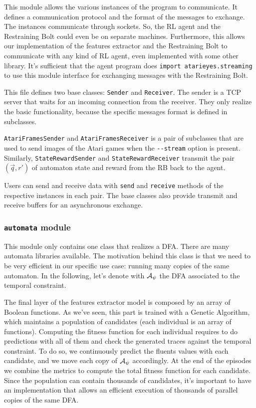 This module allows the various instances of the program to communicate. It
defines a communication protocol and the format of the messages to exchange.
The instances communicate through sockets. So, the RL agent and the
Restraining Bolt could even be on separate machines. Furthermore, this allows
our implementation of the features extractor and the Restraining Bolt to
communicate with any kind of RL agent, even implemented with some other
library. It's sufficient that the agent program does
\lstinline[style=inlinepy]|import atarieyes.streaming| to use this module
interface for exchanging messages with the Restraining Bolt.

This file defines two base classes: \texttt{Sender} and \texttt{Receiver}.
The sender is a TCP server that waits for an incoming connection from the
receiver. They only realize the basic functionality, because the specific
messages format is defined in subclasses.

\texttt{AtariFramesSender} and \texttt{AtariFramesReceiver} is a pair of
subclasses that are used to send images of the Atari games when the
\verb|--stream| option is present. Similarly, \texttt{StateRewardSender} and
\texttt{StateRewardReceiver} transmit the pair $(\vec{q}, r')$ of automaton
state and reward from the RB back to the agent.

Users can send and receive data with \texttt{send} and \texttt{receive}
methods of the respective instances in each pair.  The base classes also
provide transmit and receive buffers for an asynchronous exchange. 


\subsubsection*{\texttt{automata} module}

This module only contains one class that realizes a DFA. There are many
automata libraries available. The motivation behind this class is that we need
to be very efficient in our specific use case: running many copies of the same
automaton. In the following, let's denote with $\mathcal{A}_\psi$ the
DFA associated to the temporal constraint.

The final layer of the features extractor model is composed by an array of
Boolean functions. As we've seen, this part is trained with a Genetic
Algorithm, which maintains a population of candidates (each individual is an
array of functions). Computing the fitness function for each individual
requires to do predictions with all of them and check the generated traces
against the temporal constraint. To do so, we continuously predict the fluents
values with each candidate, and we move each copy of $\mathcal{A}_\psi$
accordingly. At the end of the episodes we combine the metrics to compute the
total fitness function for each candidate. Since the population can contain
thousands of candidates, it's important to have an implementation that allows
an efficient execution of thousands of parallel copies of the same DFA. 

